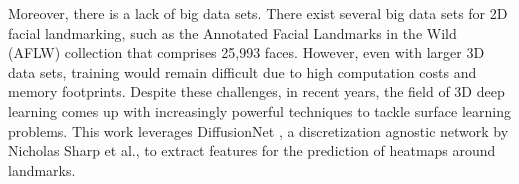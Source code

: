 Moreover, there is a lack of big data sets. There exist several big data sets for 2D facial landmarking, such as the Annotated Facial Landmarks in the Wild (AFLW) \cite{aflw} collection that comprises 25,993 faces. However, even with larger 3D data sets, training would remain difficult due to high computation costs and memory footprints.%
Despite these challenges, in recent years, the field of 3D deep learning comes up with increasingly powerful techniques to tackle surface learning problems. This work leverages DiffusionNet \cite{sharp2022diffusionnet}, a discretization agnostic network by Nicholas Sharp et al., to extract features for the prediction of heatmaps around landmarks.







